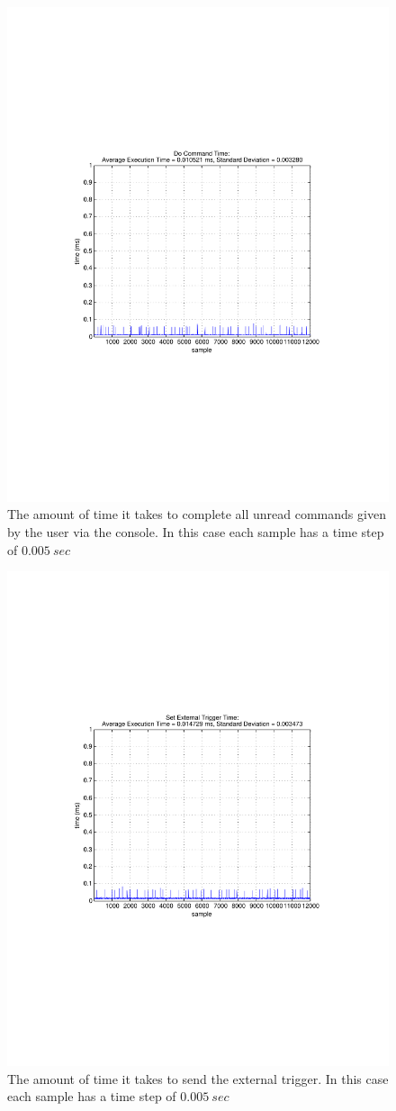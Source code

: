 \begin{itemize}
\begin{figure}[thpb]
  \centering
\includegraphics[width=0.6\columnwidth]{./timingData/doCmd.pdf}
  \caption{The amount of time it takes to complete all unread commands given by the user via the console.  In this case each sample has a time step of $0.005~sec$}
  \label{fig:timing-doCmd}
\end{figure}


\begin{figure}[thpb]
  \centering
\includegraphics[width=0.6\columnwidth]{./timingData/getTrigger.pdf}
  \caption{The amount of time it takes to send the external trigger.  In this case each sample has a time step of $0.005~sec$}
  \label{fig:timing-getTrigger}
\end{figure}


\end{itemize}
